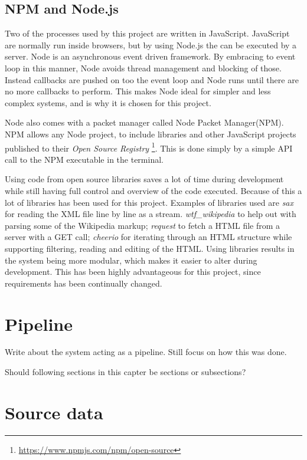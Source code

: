 \subsection{NPM and Node.js}
Two of the processes used by this project are written in JavaScript. JavaScript are normally run inside browsers, but by using Node.js\cite{node} the can be executed by a server. Node is an asynchronous event driven framework. By embracing to event loop in this manner, Node avoids thread management and blocking of those. Instead callbacks are pushed on too the event loop and Node runs until there are no more callbacks to perform. This makes Node ideal for simpler and less complex systems, and is why it is chosen for this project.

Node also comes with a packet manager called Node Packet Manager(NPM). NPM allows any Node project, to include libraries and other JavaScript projects published to their \textit{Open Source Registry} \footnote{\url{https://www.npmjs.com/npm/open-source}}. This is done simply by a simple API call to the NPM executable in the terminal. %

Using code from open source libraries saves a lot of time during development while still having full control and overview of the code executed. Because of this a lot of libraries has been used for this project. Examples of libraries used are \textit{sax} for reading the XML file line by line as a stream.  \textit{wtf\_wikipedia} to help out with parsing some of the Wikipedia markup;  \textit{request} to fetch a HTML file from a server with a GET call;  \textit{cheerio} for iterating through an HTML structure while supporting filtering, reading and editing of the HTML. Using libraries results in the system being more modular, which makes it easier to alter during development. This has been highly advantageous for this project, since requirements has been continually changed. 

\section{Pipeline}

Write about the system acting as a pipeline.
Still focus on how this was done.

Should following sections in this capter be sections or subsections?

\section{Source data}


